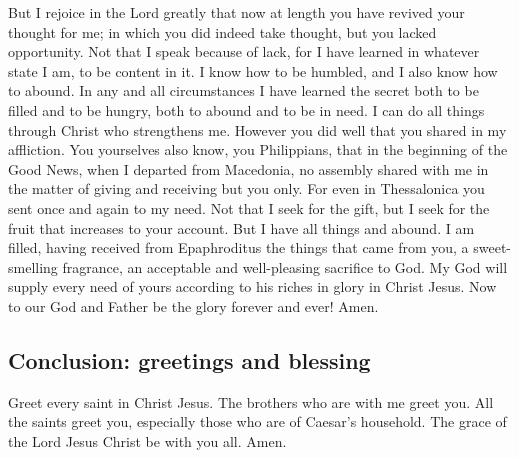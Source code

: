  But I rejoice in the Lord greatly that now at length you
have revived your thought for me; in which you did indeed take thought,
but you lacked opportunity.  Not that I speak because of
lack, for I have learned in whatever state I am, to be content in it.
 I know how to be humbled, and I also know how to abound.
In any and all circumstances I have learned the secret both to be filled
and to be hungry, both to abound and to be in need.  I
can do all things through Christ who strengthens me. 
However you did well that you shared in my affliction. 
You yourselves also know, you Philippians, that in the beginning of the
Good News, when I departed from Macedonia, no assembly shared with me in
the matter of giving and receiving but you only.  For
even in Thessalonica you sent once and again to my need. 
Not that I seek for the gift, but I seek for the fruit that increases to
your account.  But I have all things and abound. I am
filled, having received from Epaphroditus the things that came from you,
a sweet-smelling fragrance, an acceptable and well-pleasing sacrifice to
God.  My God will supply every need of yours according to
his riches in glory in Christ Jesus.  Now to our God and
Father be the glory forever and ever! Amen.

\hypertarget{conclusion-greetings-and-blessing}{%
\subsection{Conclusion: greetings and
blessing}\label{conclusion-greetings-and-blessing}}

 Greet every saint in Christ Jesus. The brothers who are
with me greet you.  All the saints greet you, especially
those who are of Caesar's household.  The grace of the
Lord Jesus Christ be with you all. Amen.
